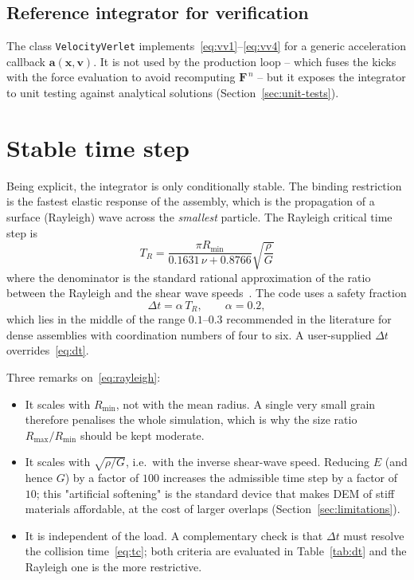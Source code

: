 \subsection{Reference integrator for verification}

The class \texttt{VelocityVerlet} implements~\eqref{eq:vv1}--\eqref{eq:vv4} for
a generic acceleration callback $\mathbf{a}(\mathbf{x},\mathbf{v})$.  It is not
used by the production loop -- which fuses the kicks with the force evaluation
to avoid recomputing $\mathbf{F}^{\,n}$ -- but it exposes the integrator to unit
testing against analytical solutions (Section~\ref{sec:unit-tests}).

\section{Stable time step}
\label{sec:timestep}

Being explicit, the integrator is only conditionally stable.  The binding
restriction is the fastest elastic response of the assembly, which is the
propagation of a surface (Rayleigh) wave across the \emph{smallest} particle.
The Rayleigh critical time step is
\begin{equation}
  \boxed{\;
  T_{R} = \frac{\pi R_{\min}}{0.1631\,\nu + 0.8766}
          \sqrt{\frac{\rho}{G}} \;}
  \label{eq:rayleigh}
\end{equation}
where the denominator is the standard rational approximation of the ratio
between the Rayleigh and the shear wave speeds~\cite{osullivan2004}.  The code
uses a safety fraction
\begin{equation}
  \Delta t = \alpha\,T_{R},
  \qquad \alpha = 0.2 ,
  \label{eq:dt}
\end{equation}
which lies in the middle of the range $0.1$--$0.3$ recommended in the
literature for dense assemblies with coordination numbers of four to six.  A
user-supplied $\Delta t$ overrides~\eqref{eq:dt}.

Three remarks on~\eqref{eq:rayleigh}:
\begin{itemize}[leftmargin=1.6em]
  \item It scales with $R_{\min}$, not with the mean radius.  A single very
        small grain therefore penalises the whole simulation, which is why the
        size ratio $R_{\max}/R_{\min}$ should be kept moderate.
  \item It scales with $\sqrt{\rho/G}$, i.e.\ with the inverse shear-wave
        speed.  Reducing $E$ (and hence $G$) by a factor of $100$ increases the
        admissible time step by a factor of $10$; this "artificial softening" is
        the standard device that makes DEM of stiff materials affordable, at
        the cost of larger overlaps (Section~\ref{sec:limitations}).
  \item It is independent of the load.  A complementary check is that
        $\Delta t$ must resolve the collision time~\eqref{eq:tc}; both criteria
        are evaluated in Table~\ref{tab:dt} and the Rayleigh one is the more
        restrictive.
\end{itemize}

